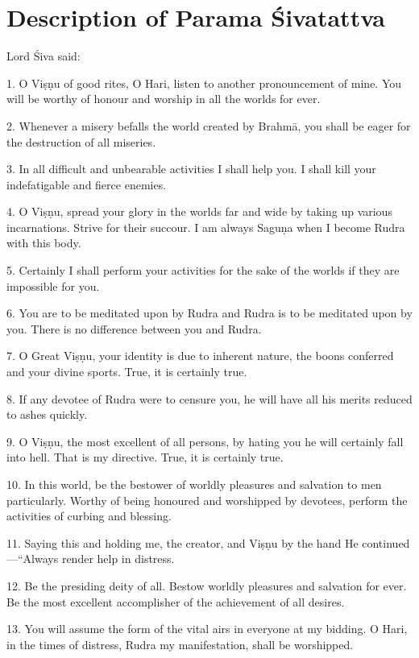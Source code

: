 \chapter{Description of Parama Śivatattva}

Lord Śiva said:

1. O Viṣṇu of good rites, O Hari, listen to another pronouncement of mine. You
will be worthy of honour and worship in all the worlds for ever.

2. Whenever a misery befalls the world created by Brahmā, you shall be eager for
the destruction of all miseries.

3. In all difficult and unbearable activities I shall help you. I shall kill
your indefatigable and fierce enemies.

4. O Viṣṇu, spread your glory in the worlds far and wide by taking up various
incarnations. Strive for their succour. I am always Saguṇa when I become Rudra
with this body.

5. Certainly I shall perform your activities for the sake of the worlds if they
are impossible for you.

6. You are to be meditated upon by Rudra and Rudra is to be meditated upon by
you. There is no difference between you and Rudra.

7. O Great Viṣṇu, your identity is due to inherent nature, the boons conferred
and your divine sports. True, it is certainly true.

8. If any devotee of Rudra were to censure you, he will have all his merits
reduced to ashes quickly.

9. O Viṣṇu, the most excellent of all persons, by hating you he will certainly
fall into hell. That is my directive. True, it is certainly true.

10. In this world, be the bestower of worldly pleasures and salvation to men
particularly. Worthy of being honoured and worshipped by devotees, perform
the activities of curbing and blessing.

11. Saying this and holding me, the creator, and Viṣṇu by the hand He
continued—“Always render help in distress.

12. Be the presiding deity of all. Bestow worldly pleasures and salvation for
ever. Be the most excellent accomplisher of the achievement of all desires.

13. You will assume the form of the vital airs in everyone at my bidding. O Hari,
in the times of distress, Rudra my manifestation, shall be worshipped.

